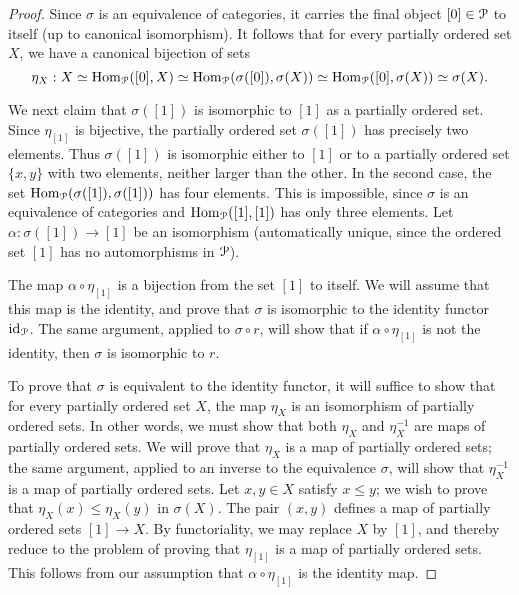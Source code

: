 \begin{proof}
Since $\sigma$ is an equivalence of categories, it carries the final object $[0] \in \operatorname{\mathcal{P}}$ to itself (up to canonical isomorphism). It follows that for every
partially ordered set $X$, we have a canonical bijection of sets
$$ \eta_{X}: X \simeq \operatorname{Hom}_{ \operatorname{\mathcal{P}}}( [0], X) \simeq
\operatorname{Hom}_{\operatorname{\mathcal{P}}}( \sigma([0]), \sigma(X) ) \simeq \operatorname{Hom}_{\operatorname{\mathcal{P}}}( [0], \sigma(X)) \simeq \sigma(X).$$

We next claim that $\sigma([1])$ is isomorphic to $[1]$ as a partially ordered set.
Since $\eta_{[1]}$ is bijective, the partially ordered set $\sigma([1])$ has precisely two elements.
Thus $\sigma([1])$ is isomorphic either to $[1]$ or to a partially ordered set $\{x,y\}$ with two elements, neither larger than the other. In the second case, the set $\operatorname{Hom}_{\operatorname{\mathcal{P}}}( \sigma([1]), \sigma([1]))$
has four elements. This is impossible, since $\sigma$ is an equivalence of categories and
$\operatorname{Hom}_{\operatorname{\mathcal{P}}}( [1], [1])$ has only three elements. Let $\alpha: \sigma([1]) \rightarrow [1]$
be an isomorphism (automatically unique, since the ordered set $[1]$ has no automorphisms in $\operatorname{\mathcal{P}}$). 

The map $\alpha \circ \eta_{[1]}$ is a bijection from the set $[1]$ to itself. We will assume that
this map is the identity, and prove that $\sigma$ is isomorphic to the identity functor $\operatorname{id}_{\operatorname{\mathcal{P}}}$.
The same argument, applied to $\sigma \circ r$, will show that if $\alpha \circ \eta_{[1]}$ is not the identity, then $\sigma$ is isomorphic to $r$.

To prove that $\sigma$ is equivalent to the identity functor, it will suffice to show that for every
partially ordered set $X$, the map $\eta_{X}$ is an isomorphism of partially ordered sets.
In other words, we must show that both $\eta_{X}$ and $\eta_{X}^{-1}$ are maps of partially ordered sets. We will prove that $\eta_{X}$ is a map of partially ordered sets; the same argument, applied to 
an inverse to the equivalence $\sigma$, will show that $\eta^{-1}_{X}$ is a map of partially ordered sets.
Let $x,y \in X$ satisfy $x \leq y$; we wish to prove that $\eta_{X}(x) \leq \eta_{X}(y)$ in $\sigma(X)$.
The pair $(x,y)$ defines a map of partially ordered sets $[1] \rightarrow X$. By functoriality, we
may replace $X$ by $[1]$, and thereby reduce to the problem of proving that $\eta_{[1]}$ is a map of partially ordered sets. This follows from our assumption that $\alpha \circ \eta_{[1]}$ is the identity map.
\end{proof}

